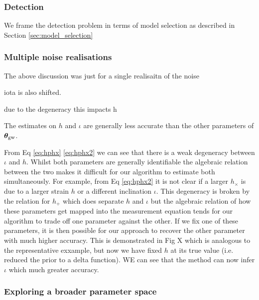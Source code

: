 \documentclass[fleqn,usenatbib,useAMS]{mnras}
\begin{document}
\subsubsection{Detection}

We frame the detection problem in terms of model selection as described in Section \ref{sec:model_selection}




\subsubsection{Multiple noise realisations} \label{sec:multiple_noise}

The above discussion was just for a single realisaitn of the noise




iota is also shifted.

due to the degeneracy this impacts h

The estimates on $h$ and $\iota$ are generally less accurate than the other parameters of $\boldsymbol{\theta}_{\rm gw}$. 


From Eq \ref{eq:hphx} \ref{eq:hphx2} we can see that there is a weak degeneracy between $\iota$ and $h$. Whilst both parameters are generally identifiable the algebraic relation between the two makes it difficult for our algorithm to estimate both simultaneously. For example, from Eq \ref{eq:hphx2} it is not clear if a larger $h_{\times}$ is due to a larger strain $h$ or a different inclination $\iota$. This degeneracy is broken by the relation for $h_{+}$ which does separate $h$ and $\iota$ but the algebraic relation of how these parameters get mapped into the measurement equation tends for our algorithm to trade off one parameter against the other. If we fix one of these parameters, it is then possible for our approach to recover the other parameter with much higher accuracy. This is demonstrated in Fig X which is analogous to the representative exxample, but now we have fixed $h$ at its true value (i.e. reduced the prior to a delta function). WE can see that the method can now infer $\iota$ which much greater accuracy. 







\subsubsection{Exploring a broader parameter space}
\end{document}
